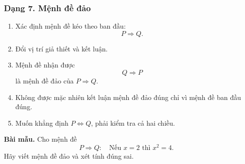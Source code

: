 \subsubsection{Dạng 7. Mệnh đề đảo}

\begin{phuongphap}
\begin{enumerate}
	\item Xác định mệnh đề kéo theo ban đầu:
	\[
	P\Rightarrow Q.
	\]
	\item Đổi vị trí giả thiết và kết luận.
	\item Mệnh đề nhận được
	\[
	Q\Rightarrow P
	\]
	là mệnh đề đảo của $P\Rightarrow Q$.
	\item Không được mặc nhiên kết luận mệnh đề đảo đúng chỉ vì mệnh đề ban đầu đúng.
	\item Muốn khẳng định $P\Leftrightarrow Q$, phải kiểm tra cả hai chiều.
\end{enumerate}
\end{phuongphap}

\begin{vidumau}

\textbf{Bài mẫu.} Cho mệnh đề
\[
P\Rightarrow Q:
\quad
\text{Nếu }x=2\text{ thì }x^2=4.
\]
Hãy viết mệnh đề đảo và xét tính đúng sai.

\end{vidumau}